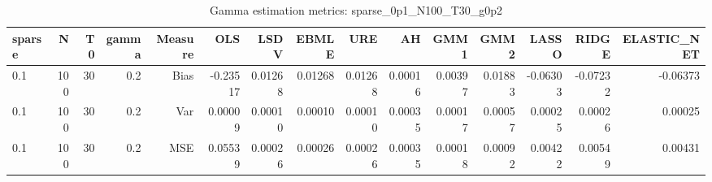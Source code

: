 \begin{table}[!htbp]\centering
\caption{Gamma estimation metrics: sparse_0p1_N100_T30_g0p2}
\label{tab:table1_sparse_0p1_N100_T30_g0p2}
\begin{tabular}{lrrrrrrrrrrrrrr}
\hline
sparse & N & T0 & gamma & Measure & OLS & LSDV & EBMLE & URE & AH & GMM1 & GMM2 & LASSO & RIDGE & ELASTIC_NET \\
\hline
0.1 & 100 & 30 & 0.2 & Bias & -0.23517 & 0.01268 & 0.01268 & 0.01268 & 0.00016 & 0.00397 & 0.01883 & -0.06303 & -0.07232 & -0.06373 \\
0.1 & 100 & 30 & 0.2 & Var & 0.00009 & 0.00010 & 0.00010 & 0.00010 & 0.00035 & 0.00017 & 0.00057 & 0.00025 & 0.00026 & 0.00025 \\
0.1 & 100 & 30 & 0.2 & MSE & 0.05539 & 0.00026 & 0.00026 & 0.00026 & 0.00035 & 0.00018 & 0.00092 & 0.00422 & 0.00549 & 0.00431 \\
\hline
\end{tabular}
\end{table}

